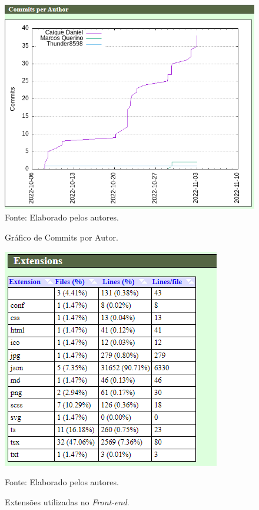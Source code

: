 \documentclass[
    12pt,               %
    openright,          %
    oneside,
    a4paper,            %
    BIBLATEX,           %
    TODO,               %
    english,            %
    brazil              %
    ]{ifsp-spo-inf-ctds}
\begin{document}
        \begin{figure}[H]
                \centering
                \caption{Gráfico de Commits por Autor.}
                \includegraphics[width=1 \textwidth]{Gitstats/front-end/CommitsPorAutor.png}
                {\footnotesize Fonte: Elaborado pelos autores.}
                \label{fig:commitFront}
        \end{figure}   

        \begin{figure}[H]
                \centering
                \caption{Extensões utilizadas no \emph{Front-end}.}
                \includegraphics[scale = 1.2]{Gitstats/front-end/ListadeExtensoes.png}

                {\footnotesize Fonte: Elaborado pelos autores.}
                \label{fig:extensaoFront}
        \end{figure}  
\end{document}
